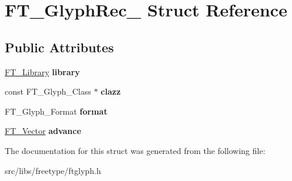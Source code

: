 \hypertarget{struct_f_t___glyph_rec__}{
\section{FT\_\-GlyphRec\_\- Struct Reference}
\label{struct_f_t___glyph_rec__}
}
\subsection*{Public Attributes}
\begin{DoxyCompactItemize}
\item 
\hypertarget{struct_f_t___glyph_rec___a00679b5e2519affab0f3999718817f8e}{
\hyperlink{struct_f_t___library_rec__}{FT\_\-Library} {\bfseries library}}
\label{struct_f_t___glyph_rec___a00679b5e2519affab0f3999718817f8e}

\item 
\hypertarget{struct_f_t___glyph_rec___ad7074cfe0e9fd6616e4dc4011e481524}{
const FT\_\-Glyph\_\-Class $\ast$ {\bfseries clazz}}
\label{struct_f_t___glyph_rec___ad7074cfe0e9fd6616e4dc4011e481524}

\item 
\hypertarget{struct_f_t___glyph_rec___a26b42a2610a69dcaed3e7c8b6d506211}{
FT\_\-Glyph\_\-Format {\bfseries format}}
\label{struct_f_t___glyph_rec___a26b42a2610a69dcaed3e7c8b6d506211}

\item 
\hypertarget{struct_f_t___glyph_rec___afd95b047df6a249db79018a279137018}{
\hyperlink{struct_f_t___vector__}{FT\_\-Vector} {\bfseries advance}}
\label{struct_f_t___glyph_rec___afd95b047df6a249db79018a279137018}

\end{DoxyCompactItemize}


The documentation for this struct was generated from the following file:\begin{DoxyCompactItemize}
\item 
src/libs/freetype/ftglyph.h\end{DoxyCompactItemize}
